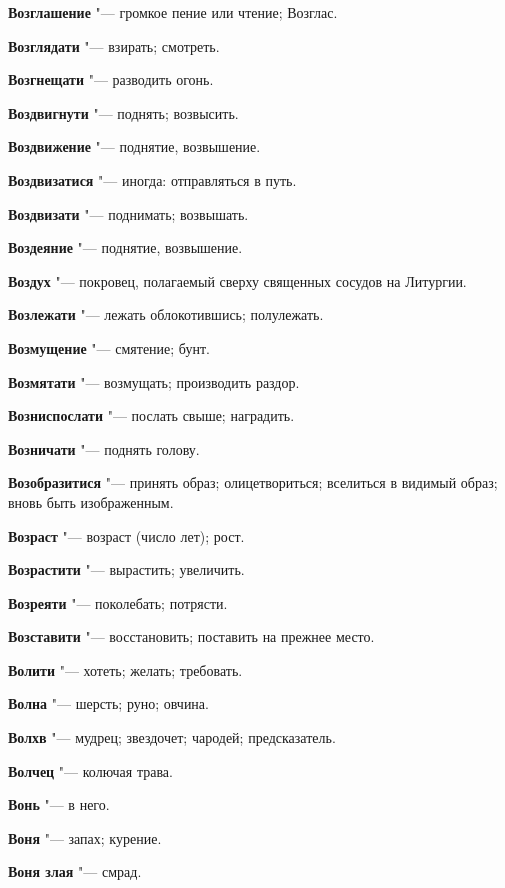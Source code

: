 \begin{mymulticols}
\noindent\textbf{Возглашение} "--- громкое пение или чтение; Возглас. 

\noindent\textbf{Возглядати} "--- взирать; смотреть. 

\noindent\textbf{Возгнещати} "--- разводить огонь. 

\noindent\textbf{Воздвигнути} "--- поднять; возвысить. 

\noindent\textbf{Воздвижение} "--- поднятие, возвышение. 

\noindent\textbf{Воздвизатися} "--- иногда: отправляться в путь. 

\noindent\textbf{Воздвизати} "--- поднимать; возвышать. 

\noindent\textbf{Воздеяние} "--- поднятие, возвышение. 

\noindent\textbf{Воздух} "--- покровец, полагаемый сверху священных сосудов на Литургии. 

\noindent\textbf{Возлежати} "--- лежать облокотившись; полулежать. 

\noindent\textbf{Возмущение} "--- смятение; бунт. 

\noindent\textbf{Возмятати} "--- возмущать; производить раздор. 

\noindent\textbf{Возниспослати} "--- послать свыше; наградить. 

\noindent\textbf{Возничати} "--- поднять голову. 

\noindent\textbf{Возобразитися} "--- принять образ; олицетвориться; вселиться в видимый образ; вновь быть изображенным. 

\noindent\textbf{Возраст} "--- возраст (число лет); рост. 

\noindent\textbf{Возрастити} "--- вырастить; увеличить. 

\noindent\textbf{Возреяти} "--- поколебать; потрясти. 

\noindent\textbf{Возставити} "--- восстановить; поставить на прежнее место. 

\noindent\textbf{Волити} "--- хотеть; желать; требовать. 

\noindent\textbf{Волна} "--- шерсть; руно; овчина. 

\noindent\textbf{Волхв} "--- мудрец; звездочет; чародей; предсказатель. 

\noindent\textbf{Волчец} "--- колючая трава. 

\noindent\textbf{Вонь} "--- в него. 

\noindent\textbf{Воня} "--- запах; курение. 

\noindent\textbf{Воня злая} "--- смрад. 


\end{mymulticols}
